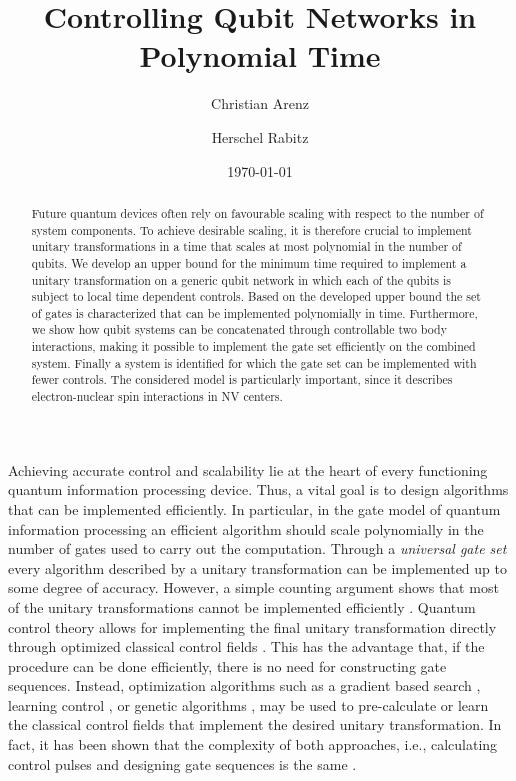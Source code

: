 \documentclass[aps,twocolumn,amsmath,amssymb,nofootinbib,superscriptaddress]{revtex4-1}
\begin{document}
\author{Christian Arenz} 

\author{Herschel Rabitz} 



\title{Controlling Qubit Networks in Polynomial Time}

\date{\today}

\begin{abstract}
Future quantum devices often rely on favourable scaling with respect to the number of system components. To achieve desirable scaling, it is therefore crucial to implement unitary transformations in a time that scales at most polynomial in the number of qubits. We develop an upper bound for the minimum time required to implement a unitary transformation on a generic qubit network in which each of the qubits is subject to local time dependent controls. Based on the developed upper bound the set of gates is characterized that can be implemented polynomially in time. Furthermore, we show how qubit systems can be concatenated through controllable two body interactions, making it possible to implement the gate set efficiently on the combined system. Finally a system is identified for which the gate set can be implemented with fewer controls. The considered model is particularly important, since it describes electron-nuclear spin interactions in NV centers.  
\end{abstract}

\maketitle
Achieving accurate control and scalability lie at the heart of every functioning quantum information processing device. Thus, a vital goal is to design algorithms that can be implemented efficiently. In particular, in the gate model of quantum information processing an efficient algorithm should scale polynomially in the number of gates used to carry out the computation. Through a \emph{universal gate set} every algorithm described by a unitary transformation can be implemented up to some degree of accuracy. However, a simple counting argument shows that most of the unitary transformations cannot be implemented efficiently \cite{NielseChuang}. Quantum control theory allows for  implementing the final unitary transformation directly through optimized classical control fields \cite{BookDalessandro, ControlRev1, ControlRev2}. This has the advantage that, if the procedure can be done efficiently, there is no need for constructing gate sequences. Instead, optimization algorithms such as a gradient based search \cite{Grape, SpinQubits}, learning control \cite{Hersch1, Daniel}, or genetic algorithms \cite{Hersch2, Manu}, may be used to pre-calculate or learn the classical control fields that implement the desired unitary transformation. In fact, it has been shown that the complexity of both approaches, i.e., calculating control pulses and designing gate sequences is the same \cite{Nielsen1, Nielsen2}. 
\end{document}

